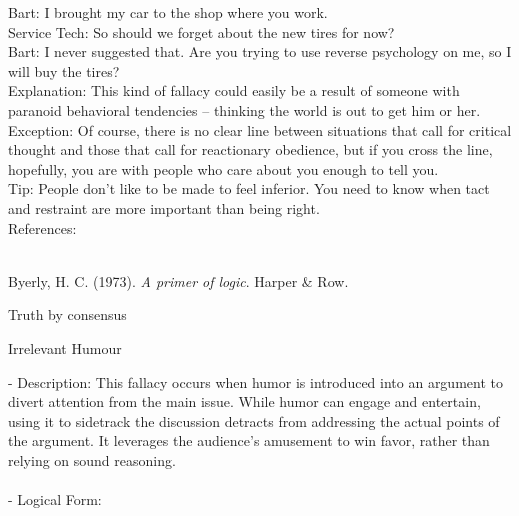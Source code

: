 \documentclass[a4paper,12pt,single,pdftex]{scrbook}
\begin{document}
    
      Bart: I brought my car to the shop where you work.
    \\

    
      Service Tech: So should we forget about the new tires for now?
    \\

    
      Bart: I never suggested that.  Are you trying to use reverse psychology on me, so I will buy the tires?
    \\

    
      Explanation: This kind of fallacy could easily be a result of someone with paranoid behavioral tendencies -- thinking the world is out to get him or her.
    \\

    
      Exception: Of course, there is no clear line between situations that call for critical thought and those that call for reactionary obedience, but if you cross the line, hopefully, you are with people who care about you enough to tell you.
    \\

    
      Tip: People don’t like to be made to feel inferior.  You need to know when tact and restraint are more important than being right.
    \\

    References:

    
      
        
      \\

      
        
          Byerly, H. C. (1973). {\it A primer of logic}. Harper \& Row.
        
      
    
  

Truth by consensus

Irrelevant Humour
    
      - Description: This fallacy occurs when humor is introduced into an argument to divert attention from the main issue. While humor can engage and entertain, using it to sidetrack the discussion detracts from addressing the actual points of the argument. It leverages the audience's amusement to win favor, rather than relying on sound reasoning.
    \\

    
      
    \\

    
      - Logical Form:
    \\
\end{document}
